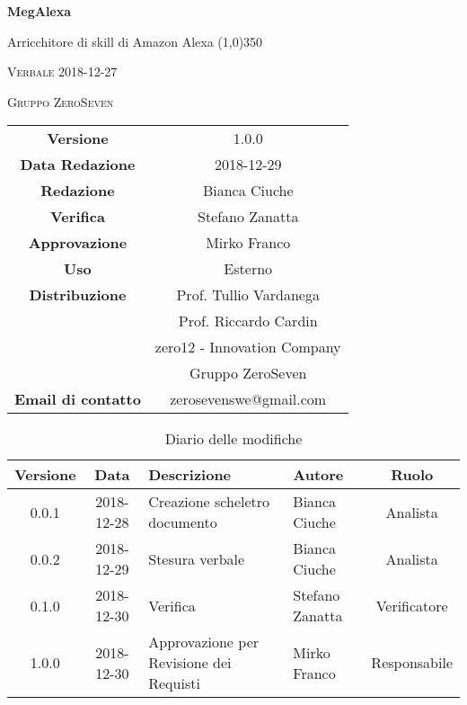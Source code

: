 \documentclass[a4paper,12pt]{article}
\author{Bianca Ciuche}
\date{2018-12-27}
\begin{document}
\begin{titlepage}
	\centering
	{\huge\bfseries MegAlexa\par}
	Arricchitore di skill di Amazon Alexa
	\line(1,0){350} \\
	{\scshape\LARGE Verbale 2018-12-27 \par}
	\vspace{1cm}
	{\scshape Gruppo ZeroSeven \par}
	\logo
	\begin{tabular}{c|c}
		{\hfill \textbf{Versione}} 			& 1.0.0				\\
		{\hfill\textbf{Data Redazione}} 	& 2018-12-29		\\ 
		{\hfill\textbf{Redazione}} 			&  		Bianca Ciuche	\\ 
		{\hfill\textbf{Verifica}} 				&  	Stefano Zanatta			\\ 
		{\hfill\textbf{Approvazione}} 		&  		Mirko Franco	\\ 
		{\hfill\textbf{Uso}} 					& 	Esterno	\\ 
		{\hfill\textbf{Distribuzione}} 			& 			Prof. Tullio Vardanega \\ & Prof. Riccardo Cardin \\ & zero12 - Innovation Company \\ & Gruppo ZeroSeven		\\ 
		{\hfill\textbf{Email di contatto}} & zerosevenswe@gmail.com \\
	\end{tabular}
\end{titlepage}
	
		\label{LastFrontPage}
	
	
	\newpage
	\cleardoublepage
	\begin{table}[tbph]
		\centering
		\begin{tabularx}{\textwidth}{|c|c|X|X|c|}
			\hline
			\textbf{Versione} & \textbf{Data} & \textbf{Descrizione} & \textbf{Autore} & \textbf{Ruolo} \\
			\hline
			0.0.1 & 2018-12-28 & Creazione scheletro documento
			& Bianca Ciuche & Analista\\
			\hline
			0.0.2 & 2018-12-29 & Stesura verbale & Bianca Ciuche &Analista \\
			\hline
			0.1.0 & 2018-12-30 & Verifica & Stefano Zanatta &Verificatore \\
			\hline
			1.0.0 & 2018-12-30 & Approvazione per Revisione dei Requisti & Mirko Franco & Responsabile \\
			\hline
		\end{tabularx}
		\caption{Diario delle modifiche}
	\end{table}
	
\end{document}

